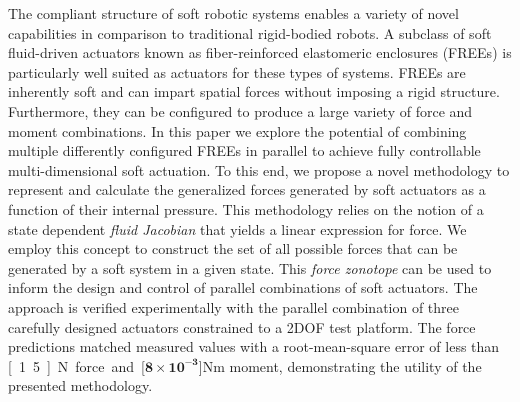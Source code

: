 The compliant structure of soft robotic systems enables a variety of novel capabilities in comparison to traditional rigid-bodied robots.
A subclass of soft fluid-driven actuators known as fiber-reinforced elastomeric enclosures (FREEs) is particularly well suited as actuators for these types of systems.
FREEs are inherently soft and can impart spatial forces without imposing a rigid structure.
Furthermore, they can be configured to produce a large variety of force and moment combinations.
In this paper we explore the potential of combining multiple differently configured FREEs in parallel to achieve fully controllable multi-dimensional soft actuation.
To this end, we propose a novel methodology to represent and calculate the generalized forces generated by soft actuators as a function of their internal pressure.
This methodology relies on the notion of a state dependent \emph{fluid Jacobian} that yields a linear expression for force. We employ this concept to construct the set of all possible forces that can be generated by a soft system in a given state.
This \emph{force zonotope} can be used to inform the design and control of parallel combinations of soft actuators.  
The approach is verified experimentally with the parallel combination of three carefully designed actuators constrained to a 2DOF test platform.
The force predictions matched measured values with a root-mean-square error of less than \unit[1.5]{N} force and \unit[$\mathbf{8 \times 10^{-3}}$]{Nm} moment, demonstrating the utility of the presented methodology.  








